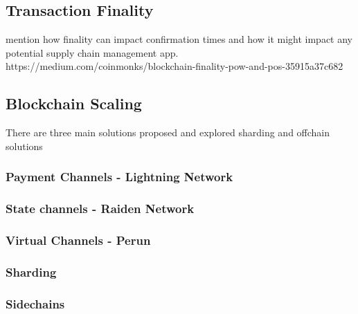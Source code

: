 \subsection{Transaction Finality}
mention how finality can impact confirmation times and how it might impact any potential supply chain management app.
https://medium.com/coinmonks/blockchain-finality-pow-and-pos-35915a37c682
\subsection{Blockchain Scaling}
There are three main solutions proposed and explored sharding and offchain solutions 
\subsubsection{Payment Channels - Lightning Network}
\subsubsection{State channels - Raiden Network}
\subsubsection{Virtual Channels - Perun}
\subsubsection{Sharding}
\subsubsection{Sidechains}